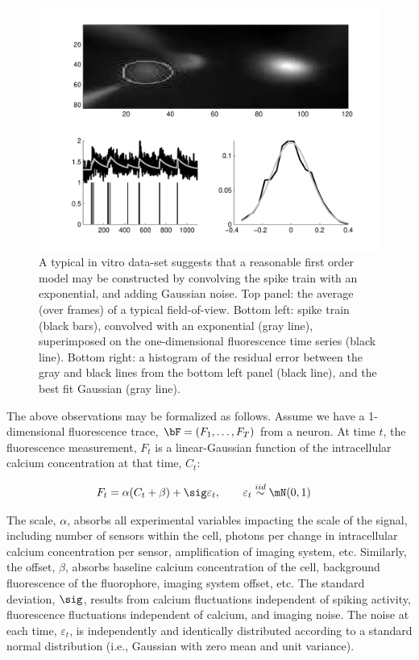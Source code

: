 \begin{figure}[h!]
\centering \includegraphics[width=.9\linewidth]{../figs/in_vitro_ex}
\caption{A typical in vitro data-set suggests that a reasonable first order model may be constructed by convolving the spike train with an exponential, and adding Gaussian noise. Top panel: the average (over frames) of a typical field-of-view.  Bottom left: spike train (black bars), convolved with an exponential (gray line), superimposed on the one-dimensional fluorescence time series (black line).  Bottom right: a histogram of the residual error between the gray and black lines from the bottom left panel (black line), and the best fit Gaussian (gray line).} \label{fig:in_vitro_ex}
\end{figure}

The above observations may be formalized as follows. Assume we have a 1-dimensional fluorescence trace, $\bF=(F_1, \ldots, F_T)$ from a neuron.  At time $t$, the fluorescence measurement, $F_t$ is a linear-Gaussian function of the intracellular calcium concentration at that time, $C_t$:

\begin{align} \label{eq:F}
F_t &= \alpha (C_t + \beta) + \sig \varepsilon_t, \qquad \varepsilon_t \overset{iid}{\sim} \mN(0,1)
\end{align}

\noindent The scale, $\alpha$, absorbs all experimental variables impacting the scale of the signal, including number of sensors within the cell, photons per change in intracellular calcium concentration per sensor, amplification of imaging system, etc.  Similarly, the offset, $\beta$, absorbs baseline calcium concentration of the cell, background fluorescence of the fluorophore, imaging system offset, etc.  The standard deviation, $\sig$, results from calcium fluctuations independent of spiking activity, fluorescence fluctuations independent of calcium, and imaging noise. The noise at each time, $\varepsilon_t$, is independently and identically distributed according to a standard normal distribution (i.e., Gaussian with zero mean and unit variance).  %

